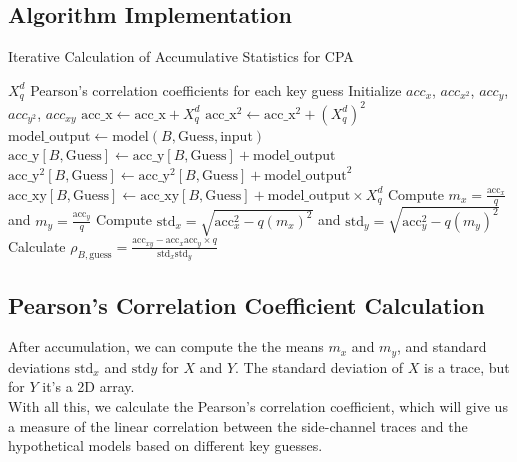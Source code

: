 \documentclass[a4paper,10pt]{article}
\begin{document}
\subsection{Algorithm Implementation}

\begin{algorithm}
\begin{spacing}{0.85}
    \caption{Iterative Calculation of Accumulative Statistics for CPA}
    \label{algo3}
    \begin{algorithmic}
    \Require $X^{d}_{q}$ 
    \Ensure Pearson's correlation coefficients for each key guess
    \State Initialize $acc_x$, $acc_{x^2}$, $acc_y$, $acc_{y^2}$, $acc_{xy}$
        \State $\text{acc\_x} \gets \text{acc\_x} + X^{d}_{q}$
        \State $\text{acc\_x}^2 \gets \text{acc\_x}^2 + (X^{d}_{q})^2$
         
             
                \State $\text{model\_output} \gets \text{model}(B, \text{Guess}, \text{input})$
                \State $\text{acc\_y}[B, \text{Guess}] \gets \text{acc\_y}[B, \text{Guess}] + \text{model\_output}$
                \State $\text{acc\_y}^2[B, \text{Guess}] \gets \text{acc\_y}^2[B, \text{Guess}] + \text{model\_output}^2$
                \State $\text{acc\_xy}[B, \text{Guess}] \gets \text{acc\_xy}[B, \text{Guess}] + \text{model\_output} \times X^{d}_{q}$
            \EndFor
        \EndFor
    \EndFor
    \State Compute $m_x = \frac{\text{acc}_x}{q}$ and $m_y = \frac{\text{acc}_y}{q}$
    \State Compute $\text{std}_x = \sqrt{\text{acc}_x^2 - q(m_x)^2}$ and $\text{std}_y = \sqrt{\text{acc}_y^2 - q(m_y)^2}$
    \State Calculate $\rho_{B,\text{guess}} = \frac{\text{acc}_{xy} - \text{acc}_x \text{acc}_y \times q}{\text{std}_x \text{std}_y}$
    \end{algorithmic}
\end{spacing}
\end{algorithm}


\noindent
\subsection{Pearson's Correlation Coefficient Calculation}
After accumulation, we can compute the the means $m_x$ and $m_y$, and standard deviations $\text{std}_x$ and $\text{std}y$ for $X$ and $Y$. The standard deviation of $X$ is a trace, but for $Y$ it's a 2D array. 
\\
With all this, we calculate the Pearson's correlation coefficient, which will give us a measure of the linear correlation between the side-channel traces and the hypothetical models based on different key guesses.
\end{document}
